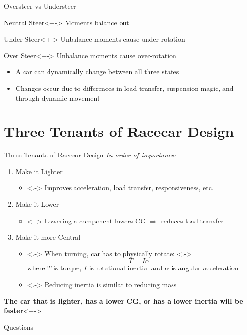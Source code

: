 \documentclass[aspectratio=169]{beamer}
\begin{document}
\begin{frame}{Oversteer vs Understeer}
    \begin{block}{Neutral Steer}<+->
        Moments balance out
    \end{block}
    \begin{block}{Under Steer}<+->
        Unbalance moments cause under-rotation
    \end{block}
    \begin{block}{Over Steer}<+->
        Unbalance moments cause over-rotation
    \end{block}

    \begin{itemize}
        \item<+-> A car can dynamically change between all three states
        \item<+-> Changes occur due to differences in load transfer, suspension magic, and through dynamic movement
    \end{itemize}
\end{frame}

\section{Three Tenants of Racecar Design}
\begin{frame}{Three Tenants of Racecar Design}
    \textit{In order of importance:}
    \begin{enumerate}
        \item<+-> Make it Lighter
            \begin{itemize}
                \item<.-> Improves acceleration, load transfer, responsiveness, etc.
            \end{itemize}
        \item<+-> Make it Lower
            \begin{itemize}
                \item<.-> Lowering a component lowers CG \(\Rightarrow\) reduces load transfer
            \end{itemize}
        \item<+-> Make it more Central
            \begin{itemize}
                \item<.-> When turning, car has to physically rotate:
                    \onslide<.->{
                        \[T=I\alpha\]
                        where \(T\) is torque, \(I\) is rotational inertia, and \(\alpha\) is angular acceleration
                    }
                \item<.-> Reducing inertia is similar to reducing mass
            \end{itemize}
    \end{enumerate}
    \begin{alertblock}{\textbf{The car that is lighter, has a lower CG, or has a lower inertia will be faster}}<+->
    \end{alertblock}

\end{frame}


\begin{frame}{Questions}

\end{frame}
\end{document}
